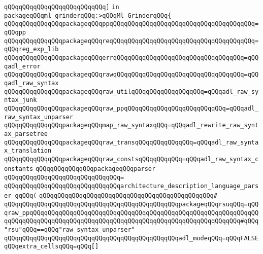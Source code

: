 \verb|qQQqqQQqqQQqqQQqqQQqqQQqqQQq]|\newline
\verb|in|\newline
\newline
\verb|packageqQQqml_grinderqQQq:>qQQqMl_GrinderqQQq{|\newline
\newline
\verb|qQQqqQQqqQQqqQQqpackageqQQqppqQQqqQQqqQQqqQQqqQQqqQQqqQQqqQQqqQQqqQQq=qQQqpp|\newline
\verb|qQQqqQQqqQQqqQQqpackageqQQqreqQQqqQQqqQQqqQQqqQQqqQQqqQQqqQQqqQQqqQQq=qQQqreg_exp_lib|\newline
\verb|qQQqqQQqqQQqqQQqpackageqQQqerrqQQqqQQqqQQqqQQqqQQqqQQqqQQqqQQqqQQq=qQQqadl_error|\newline
\verb|qQQqqQQqqQQqqQQqpackageqQQqrawqQQqqQQqqQQqqQQqqQQqqQQqqQQqqQQqqQQq=qQQqadl_raw_syntax|\newline
\verb|qQQqqQQqqQQqqQQqpackageqQQqraw_utilqQQqqQQqqQQqqQQqqQQq=qQQqadl_raw_syntax_junk|\newline
\verb|qQQqqQQqqQQqqQQqpackageqQQqraw_ppqQQqqQQqqQQqqQQqqQQqqQQqqQQq=qQQqadl_raw_syntax_unparser|\newline
\verb|qQQqqQQqqQQqqQQqpackageqQQqmap_raw_syntaxqQQq=qQQqadl_rewrite_raw_syntax_parsetree|\newline
\newline
\verb|qQQqqQQqqQQqqQQqpackageqQQqraw_transqQQqqQQqqQQqqQQq=qQQqadl_raw_syntax_translation|\newline
\newline
\verb|qQQqqQQqqQQqqQQqpackageqQQqraw_constsqQQqqQQqqQQq=qQQqadl_raw_syntax_constants|\newline
\newline
\verb|qQQqqQQqqQQqqQQqpackageqQQqparser|\newline
\verb|qQQqqQQqqQQqqQQqqQQqqQQqqQQqqQQq=|\newline
\verb|qQQqqQQqqQQqqQQqqQQqqQQqqQQqqQQqarchitecture_description_language_parser_gqQQq(|\newline
\verb|qQQqqQQqqQQqqQQqqQQqqQQqqQQqqQQqqQQqqQQqqQQqqQQq#|\newline
\verb|qQQqqQQqqQQqqQQqqQQqqQQqqQQqqQQqqQQqqQQqqQQqqQQqpackageqQQqrsuqQQq=qQQqraw_ppqQQqqQQqqQQqqQQqqQQqqQQqqQQqqQQqqQQqqQQqqQQqqQQqqQQqqQQqqQQqqQQqqQQqqQQqqQQqqQQqqQQqqQQqqQQqqQQqqQQqqQQqqQQqqQQqqQQqqQQqqQQqqQQq#qQQq"rsu"qQQq==qQQq"raw_syntax_unparser"|\newline
\verb|qQQqqQQqqQQqqQQqqQQqqQQqqQQqqQQqqQQqqQQqqQQqqQQqadl_modeqQQq=qQQqFALSEqQQqextra_cellsqQQq=qQQq[]|\newline
